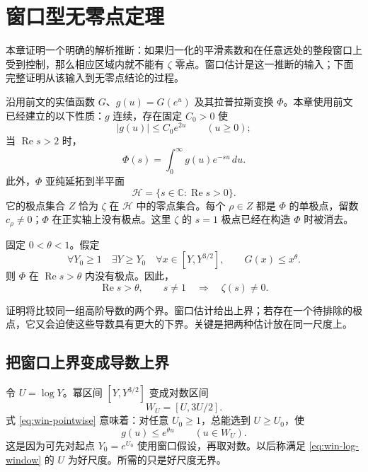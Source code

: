 \chapter{窗口型无零点定理}
\label{chap:window-proof}
\label{chap:window}

本章证明一个明确的解析推断：如果归一化的平滑素数和在任意远处的整段窗口上受到控制，那么相应区域内就不能有 $\zeta$ 零点。窗口估计是这一推断的输入；下面完整证明从该输入到无零点结论的过程。

沿用前文的实值函数 $G$、$g(u)=G(e^u)$ 及其拉普拉斯变换 $\Phi$。本章使用前文已经建立的以下性质：$g$ 连续，存在固定 $C_0>0$ 使
\begin{equation}
 |g(u)|\le C_0e^{2u}\qquad(u\ge0);
 \label{eq:win-growth}
\end{equation}
当 $\operatorname{Re}s>2$ 时，
\begin{equation}
 \Phi(s)=\int_0^\infty g(u)e^{-su}\,du.
 \label{eq:win-laplace}
\end{equation}
此外，$\Phi$ 亚纯延拓到半平面
\[
 \mathcal H=\{s\in\mathbb C:\operatorname{Re}s>0\}.
\]
它的极点集合 $Z$ 恰为 $\zeta$ 在 $\mathcal H$ 中的零点集合。每个 $\rho\in Z$ 都是 $\Phi$ 的单极点，留数 $c_\rho\ne0$；$\Phi$ 在正实轴上没有极点。这里 $\zeta$ 的 $s=1$ 极点已经在构造 $\Phi$ 时被消去。

\begin{theorem}[窗口型无零点定理]
\label{thm:window-zeta}
固定 $0<\theta<1$。假定
\begin{equation}
 \forall Y_0\ge1\quad
 \exists Y\ge Y_0\quad
 \forall x\in[Y,Y^{3/2}],
 \qquad G(x)\le x^\theta.
 \label{eq:win-pointwise}
\end{equation}
则 $\Phi$ 在 $\operatorname{Re}s>\theta$ 内没有极点。因此，
\[
 \operatorname{Re}s>\theta,\qquad s\ne1
 \quad\Longrightarrow\quad \zeta(s)\ne0.
\]
\end{theorem}

证明将比较同一组高阶导数的两个界。窗口估计给出上界；若存在一个待排除的极点，它又会迫使这些导数具有更大的下界。关键是把两种估计放在同一尺度上。

\section{把窗口上界变成导数上界}

令 $U=\log Y$。幂区间 $[Y,Y^{3/2}]$ 变成对数区间
\[
 W_U=[U,3U/2].
\]
式 \eqref{eq:win-pointwise} 意味着：对任意 $U_0\ge1$，总能选到 $U\ge U_0$，使
\begin{equation}
 g(u)\le e^{\theta u}\qquad(u\in W_U).
 \label{eq:win-log-window}
\end{equation}
这是因为可先对起点 $Y_0=e^{U_0}$ 使用窗口假设，再取对数。以后称满足 \eqref{eq:win-log-window} 的 $U$ 为好尺度。所需的只是好尺度无界。

